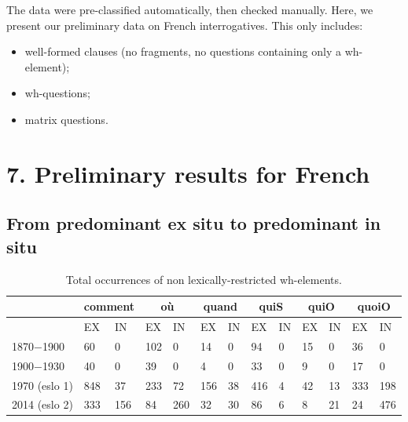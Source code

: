 \documentclass[fleqn,10pt]{wlscirep}
\begin{document}
\noindent The data were pre-classified automatically, then checked manually.
\noindent Here, we present our preliminary data on French interrogatives. This only includes:
\begin{itemize}
    \item[\ding{227}] \vspace*{-2mm} well-formed clauses (no fragments, no questions containing only a wh-element);
    \item[\ding{227}] \vspace*{-2mm} wh-questions;
    \item[\ding{227}] \vspace*{-2mm} matrix questions.
\end{itemize}

\section*{7. Preliminary results for French}

\subsection*{From predominant ex situ to predominant in situ}

\begin{table}[H]
    \centering
    \small
    \begin{adjustbox}{width=\textwidth}
        \begin{tabular}{l|ll|ll|ll|ll|ll|ll}
        {} & \multicolumn{2}{c}{comment}  & \multicolumn{2}{c}{où} & \multicolumn{2}{c}{quand}& \multicolumn{2}{c}{quiS} & \multicolumn{2}{c}{quiO}& \multicolumn{2}{c}{quoiO}\\
        \hline
        {} & EX & IN & EX & IN & EX & IN & EX & IN & EX & IN & EX & IN\\
        1870$-$1900 & 60 & 0 & 102 & 0 & 14 & 0 & 94 & 0 & 15 & 0 & 36 & 0\\
        1900$-$1930 & 40 & 0 & 39 & 0 & 4 & 0 & 33 & 0 & 9 & 0 & 17 & 0\\
        1970 (eslo 1) & 848 & 37 & 233 & 72 & 156 & 38 & 416 & 4 & 42 & 13 & 333 & 198\\
        2014 (eslo 2) & 333 & 156 & 84 & 260 & 32 & 30 & 86 & 6 & 8 & 21 & 24 & 476 \\
        \hline
        \end{tabular}
    \end{adjustbox}
\caption{\label{tab:samp3}Total occurrences of non lexically-restricted wh-elements.}
\end{table}
\end{document}
